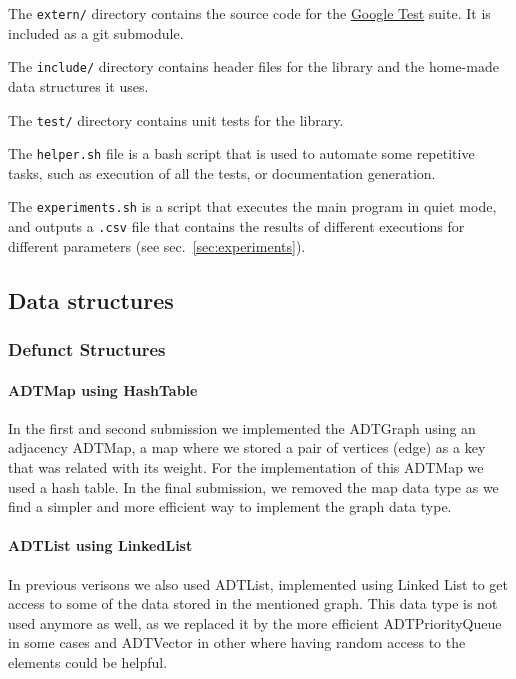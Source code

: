 \documentclass[
  10,
  letterpaperpaper,
  twocolumn]{article}
\begin{document}
The \texttt{extern/} directory contains the source code for
the \href{https://github.com/google/googletest}{Google Test} suite. It
is included as a git submodule.

The \texttt{include/} directory contains header files for
the library and the home-made data structures it uses.

The \texttt{test/} directory contains unit tests for the
library.

The \texttt{helper.sh} file is a bash script that is used to
automate some repetitive tasks, such as execution of all the tests, or
documentation generation.

The \texttt{experiments.sh} is a script that executes the
main program in quiet mode, and outputs a \texttt{.csv} file
that contains the results of different executions for different
parameters (see sec.~\ref{sec:experiments}).

\subsection{Data structures}\label{data-structures}

\subsubsection{Defunct Structures}\label{defunct-structures}

\paragraph{ADTMap using HashTable}\label{adtmap-using-hashtable}

In the first and second submission we implemented the ADTGraph using an
adjacency ADTMap, a map where we stored a pair of vertices (edge) as a
key that was related with its weight. For the implementation of this
ADTMap we used a hash table. In the final submission, we removed the map
data type as we find a simpler and more efficient way to implement the
graph data type.

\paragraph{ADTList using LinkedList}\label{adtlist-using-linkedlist}

In previous verisons we also used ADTList, implemented using Linked List
to get access to some of the data stored in the mentioned graph. This
data type is not used anymore as well, as we replaced it by the more
efficient ADTPriorityQueue in some cases and ADTVector in other where
having random access to the elements could be helpful.
\end{document}
